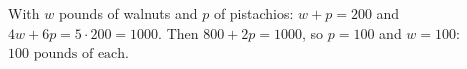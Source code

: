 With $w$ pounds of walnuts and $p$ of pistachios: $w+p=200$ and $4w+6p=5\cdot200=1000$. Then $800+2p=1000$, so $p=100$ and $w=100$: $\boxed{100\text{ pounds of each}}$.
